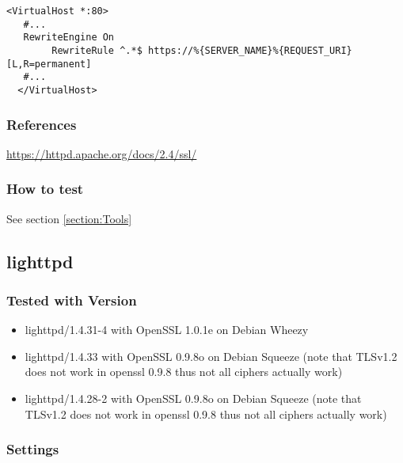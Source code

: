 \begin{lstlisting}[breaklines]
  <VirtualHost *:80>
   #...
   RewriteEngine On
        RewriteRule ^.*$ https://%{SERVER_NAME}%{REQUEST_URI} [L,R=permanent]
   #...
  </VirtualHost>
\end{lstlisting}


\subsubsection{References}
\url{https://httpd.apache.org/docs/2.4/ssl/}


\subsubsection{How to test}

See section \ref{section:Tools}



\subsection{lighttpd}



\subsubsection{Tested with Version}
\begin{itemize}
\item lighttpd/1.4.31-4 with OpenSSL 1.0.1e on Debian Wheezy
\item lighttpd/1.4.33 with OpenSSL 0.9.8o on Debian Squeeze (note that TLSv1.2 does not work in openssl 0.9.8 thus not all ciphers actually work)
\item lighttpd/1.4.28-2 with OpenSSL 0.9.8o on Debian Squeeze (note that TLSv1.2 does not work in openssl 0.9.8 thus not all ciphers actually work)
\end{itemize}


\subsubsection{Settings}


